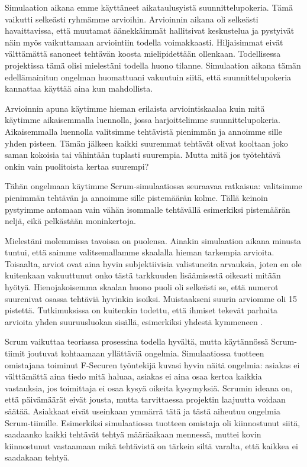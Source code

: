\documentclass[a4paper]{article}
\begin{document}
Simulaation aikana emme käyttäneet aikataulusyistä suunnittelupokeria. Tämä vaikutti selkeästi ryhmämme arvioihin. Arvioinnin aikana oli selkeästi havaittavissa, että muutamat äänekkäimmät hallitsivat keskustelua ja pystyivät näin myös vaikuttamaan arviointiin todella voimakkaasti. Hiljaisimmat eivät välttämättä sanoneet tehtävän koosta mielipidettään ollenkaan. Todellisessa projektissa tämä olisi mielestäni todella huono tilanne. Simulaation aikana tämän edellämainitun ongelman huomattuani vakuutuin siitä, että suunnittelupokeria kannattaa käyttää aina kun mahdollista.

Arvioinnin apuna käytimme hieman erilaista arviointiskaalaa kuin mitä käytimme aikaisemmalla luennolla, jossa harjoittelimme suunnittelupokeria. Aikaisemmalla luennolla valitsimme tehtävistä pienimmän ja annoimme sille yhden pisteen. Tämän jälkeen kaikki suuremmat tehtävät olivat kooltaan joko saman kokoisia tai vähintään tuplasti suurempia. Mutta mitä jos työtehtävä onkin vain puolitoista kertaa suurempi?

Tähän ongelmaan käytimme Scrum-simulaatiossa seuraavaa ratkaisua: valitsimme pienimmän tehtävän ja annoimme sille pistemäärän kolme. Tällä keinoin pystyimme antamaan vain vähän isommalle tehtävällä esimerkiksi pistemäärän neljä, eikä pelkästään moninkertoja.

Mielestäni molemmissa tavoissa on puolensa. Ainakin simulaation aikana minusta tuntui, että saimme valitsemallamme skaalalla hieman tarkempia arvioita. Toisaalta, arviot ovat aina hyvin subjektiivisia valistuneita arvauksia, joten en ole kuitenkaan vakuuttunut onko tästä tarkkuuden lisäämisestä oikeasti mitään hyötyä. Hienojakoisemma skaalan huono puoli oli selkeästi se, että numerot suurenivat osassa tehtäviä hyvinkin isoiksi. Muistaakseni suurin arviomme oli 15 pistettä. Tutkimuksissa on kuitenkin todettu, että ihmiset tekevät parhaita arvioita yhden suuruusluokan sisällä, esimerkiksi yhdestä kymmeneen \citep{cohn}.

Scrum vaikuttaa teoriassa prosessina todella hyvältä, mutta käytännössä Scrum-tiimit joutuvat kohtaamaan yllättäviä ongelmia. Simulaatiossa tuotteen omistajana toiminut F-Securen työntekijä kuvasi hyvin näitä ongelmia: asiakas ei välttämättä aina tiedo mitä haluaa, asiakas ei aina osaa kertoa kaikkia vastauksia, jos toimittaja ei osaa kysyä oikeita kysymyksiä. Scrumin ideana on, että päivämäärät eivät jousta, mutta tarvittaessa projektin laajuutta voidaan säätää. Asiakkaat eivät useinkaan ymmärrä tätä ja tästä aiheutuu ongelmia Scrum-tiimille. Esimerkiksi simulaatiossa tuotteen omistaja oli kiinnostunut siitä, saadaanko kaikki tehtävät tehtyä määräaikaan mennessä, muttei kovin kiinnostunut vastaamaan mikä tehtävistä on tärkein siltä varalta, että kaikkea ei saadakaan tehtyä.
\end{document}
